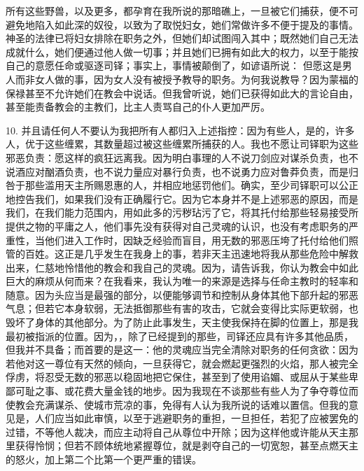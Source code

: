 所有这些野兽，以及更多，都孕育在我所说的那暗礁上，一旦被它们捕获，便不可避免地陷入如此深的奴役，以致为了取悦妇女，她们常做许多不便于提及的事情。神圣的法律已将妇女排除在职务之外，但她们却试图闯入其中；既然她们自己无法成就什么，她们便通过他人做一切事；并且她们已拥有如此大的权力，以至于能按自己的意愿任命或驱逐司铎；事实上，事情被颠倒了，如谚语所说： 但愿这是男人而非女人做的事，因为女人没有被授予教导的职务。为何我说教导？因为蒙福的保禄甚至不允许她们在教会中说话。但我曾听说，她们已获得如此大的言论自由，甚至能责备教会的主教们，比主人责骂自己的仆人更加严厉。\par

10. 并且请任何人不要认为我把所有人都归入上述指控：因为有些人，是的，许多人，优于这些缠累，其数量超过被这些缠累所捕获的人。我也不愿让司铎职为这些邪恶负责：愿这样的疯狂远离我。因为明白事理的人不说刀剑应对谋杀负责，也不说酒应对酗酒负责，也不说力量应对暴行负责，也不说勇力应对鲁莽负责，而是归咎于那些滥用天主所赐恩惠的人，并相应地惩罚他们。确实，至少司铎职可以公正地控告我们，如果我们没有正确履行它。因为它本身并不是上述邪恶的原因，而是我们，在我们能力范围内，用如此多的污秽玷污了它，将其托付给那些轻易接受所提供之物的平庸之人，他们事先没有获得对自己灵魂的认识，也没有考虑职务的严重性，当他们进入工作时，因缺乏经验而盲目，用无数的邪恶压垮了托付给他们照管的百姓。这正是几乎发生在我身上的事，若非天主迅速地将我从那些危险中解救出来，仁慈地怜惜他的教会和我自己的灵魂。因为，请告诉我，你认为教会中如此巨大的麻烦从何而来？在我看来，我认为唯一的来源是选择与任命主教时的轻率和随意。因为头应当是最强的部分，以便能够调节和控制从身体其他下部升起的邪恶气息；但若它本身软弱，无法抵御那些有害的攻击，它就会变得比实际更软弱，也毁坏了身体的其他部分。为了防止此事发生，天主使我保持在脚的位置上，那是我最初被指派的位置。因为，，除了已经提到的那些，司铎还应具有许多其他品质，但我并不具备；而首要的是这一：他的灵魂应当完全清除对职务的任何贪欲：因为若他对这一尊位有天然的倾向，一旦获得它，就会燃起更强烈的火焰，那人被完全俘虏，将忍受无数的邪恶以稳固地把它保住，甚至到了使用谄媚、或屈从于某些卑鄙可耻之事、或花费大量金钱的地步。因为我现在不谈那些有些人为了争夺尊位而使教会充满谋杀、使城市荒凉的事，免得有人认为我所说的话难以置信。但我的意见是，人们应当如此审慎，以至于逃避职务的重担，一旦担任，若犯了应被罢免的过错，不等他人裁决，而应主动将自己从尊位中开除；因为这样他或许能从天主那里获得怜悯；但若不顾体统地紧握尊位，就是剥夺自己的一切宽恕，甚至点燃天主的怒火，加上第二个比第一个更严重的错误。\par


